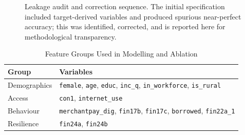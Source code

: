 \documentclass[conference]{IEEEtran}
\begin{document}
\begin{figure}[h]
\centering
{}
\caption{Leakage audit and correction sequence. The initial specification
included target-derived variables and produced spurious near-perfect
accuracy; this was identified, corrected, and is reported here for
methodological transparency.}
\label{fig:leakage_pipeline}
\end{figure}

\begin{table}[h]
\caption{Feature Groups Used in Modelling and Ablation}
\label{tab:feature_groups}
\centering
\renewcommand{\arraystretch}{1.3}
\begin{tabular}{@{}p{2.1cm}p{5.7cm}@{}}
\toprule
\textbf{Group} & \textbf{Variables} \\
\midrule
Demographics & \texttt{female}, \texttt{age}, \texttt{educ},
\texttt{inc\_q}, \texttt{in\_workforce}, \texttt{is\_rural} \\
\addlinespace
Access & \texttt{con1}, \texttt{internet\_use} \\
\addlinespace
Behaviour & \texttt{merchantpay\_dig}, \texttt{fin17b},
\texttt{fin17c}, \texttt{borrowed}, \texttt{fin22a\_1} \\
\addlinespace
Resilience & \texttt{fin24a}, \texttt{fin24b} \\
\bottomrule
\end{tabular}
\end{table}
 
\end{document}

